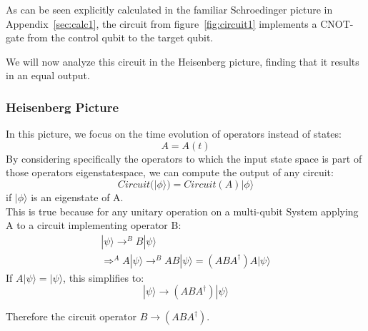 As can be seen explicitly calculated in the familiar Schroedinger 
picture in Appendix~\ref{sec:calc1}, the circuit from figure~\ref{fig:circuit1}
implements a CNOT-gate from the control qubit to the target qubit.

We will now analyze this circuit in the Heisenberg picture,
finding that it results in an equal output.

\subsubsection{Heisenberg Picture}
In this picture, we focus on the time evolution of operators instead
of states:
\begin{equation}
	A = A(t)
\end{equation}
By considering specifically the operators to which the input state
space is part of those operators eigenstatespace, we can compute
the output of any circuit:
\begin{equation}
	Circuit(|\phi\rangle) = Circuit(A)|\phi\rangle
\end{equation}
if $|\phi\rangle$ is an eigenstate of A.\\
This is true because for any unitary operation on a multi-qubit
System applying A to a circuit implementing operator B:
\begin{align}
	|\psi\rangle \rightarrow^{B} B|\psi\rangle \\
	\Rightarrow^A A|\psi\rangle \rightarrow^{B} AB|\psi\rangle =
	(ABA^{\dagger})A |\psi\rangle
\end{align}
If $A|\psi\rangle = |\psi\rangle$, this simplifies to:
\begin{equation}
	|\psi\rangle \rightarrow (ABA^{\dagger})|\psi\rangle
\end{equation}

Therefore the circuit operator $B\rightarrow (ABA^{\dagger})$. 

